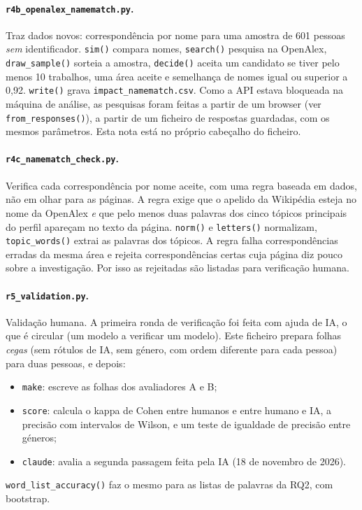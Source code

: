 \documentclass[11pt,a4paper]{article}
\newcommand{\file}[1]{\texttt{#1}}
\newcommand{\fn}[1]{\texttt{#1()}}
\begin{document}
\paragraph{\file{r4b_openalex_namematch.py}.} Traz dados novos: correspondência por nome para uma amostra de 601 pessoas \emph{sem} identificador. \fn{sim} compara nomes, \fn{search} pesquisa na OpenAlex, \fn{draw_sample} sorteia a amostra, \fn{decide} aceita um candidato se tiver pelo menos 10 trabalhos, uma área aceite e semelhança de nomes igual ou superior a 0,92. \fn{write} grava \file{impact_namematch.csv}. Como a API estava bloqueada na máquina de análise, as pesquisas foram feitas a partir de um browser (ver \fn{from_responses}), a partir de um ficheiro de respostas guardadas, com os mesmos parâmetros. Esta nota está no próprio cabeçalho do ficheiro.

\paragraph{\file{r4c_namematch_check.py}.} Verifica cada correspondência por nome aceite, com uma regra baseada em dados, não em olhar para as páginas. A regra exige que o apelido da Wikipédia esteja no nome da OpenAlex \emph{e} que pelo menos duas palavras dos cinco tópicos principais do perfil apareçam no texto da página. \fn{norm} e \fn{letters} normalizam, \fn{topic_words} extrai as palavras dos tópicos. A regra falha correspondências erradas da mesma área e rejeita correspondências certas cuja página diz pouco sobre a investigação. Por isso as rejeitadas são listadas para verificação humana.

\paragraph{\file{r5_validation.py}.} Validação humana. A primeira ronda de verificação foi feita com ajuda de IA, o que é circular (um modelo a verificar um modelo). Este ficheiro prepara folhas \emph{cegas} (sem rótulos de IA, sem género, com ordem diferente para cada pessoa) para duas pessoas, e depois:
\begin{itemize}
  \item \texttt{make}: escreve as folhas dos avaliadores A e B;
  \item \texttt{score}: calcula o kappa de Cohen entre humanos e entre humano e IA, a precisão com intervalos de Wilson, e um teste de igualdade de precisão entre géneros;
  \item \texttt{claude}: avalia a segunda passagem feita pela IA (18 de novembro de 2026).
\end{itemize}
\fn{word_list_accuracy} faz o mesmo para as listas de palavras da RQ2, com bootstrap.
\end{document}
